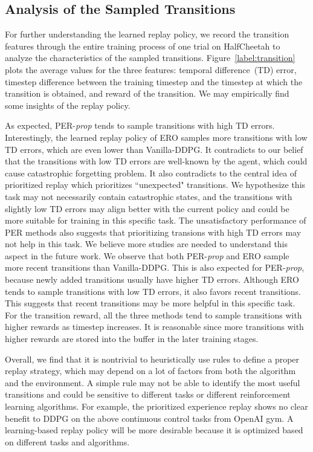 \documentclass{article}
\begin{document}
\subsection{Analysis of the Sampled Transitions}
For further understanding the learned replay policy, we record the transition features through the entire training process of one trial on HalfCheetah to analyze the characteristics of the sampled transitions. Figure~\ref{label:transition} plots the average values for the three features: temporal difference~(TD) error, timestep difference between the training timestep and the timestep at which the transition is obtained, and reward of the transition. We may empirically find some insights of the replay policy.

As expected, PER-\emph{prop} tends to sample transitions with high TD errors. Interestingly, the learned replay policy of ERO samples more transitions with low TD errors, which are even lower than Vanilla-DDPG. It contradicts to our belief that the transitions with low TD errors are well-known by the agent, which could cause catastrophic forgetting problem. It also contradicts to the central idea of prioritized replay which prioritizes ``unexpected" transitions. We hypothesize this task may not necessarily contain catastrophic states, and the transitions with slightly low TD errors may align better with the current policy and could be more suitable for training in this specific task. The unsatisfactory performance of PER methods also suggests that prioritizing transions with high TD errors may not help in this task. We believe more studies are needed to understand this aspect in the future work. We observe that both PER-\emph{prop} and ERO sample more recent transitions than Vanilla-DDPG. This is also expected for PER-\emph{prop}, because newly added transitions usually have higher TD errors. Although ERO tends to sample transitions with low TD errors, it also favors recent transitions. This suggests that recent transitions may be more helpful in this specific task. For the transition reward, all the three methods tend to sample transitions with higher rewards as timestep increases. It is reasonable since more transitions with higher rewards are stored into the buffer in the later training stages.

Overall, we find that it is nontrivial to heuristically use rules to define a proper replay strategy, which may depend on a lot of factors from both the algorithm and the environment. A simple rule may not be able to identify the most useful transitions and could be sensitive to different tasks or different reinforcement learning algorithms. For example, the prioritized experience replay shows no clear benefit to DDPG on the above continuous control tasks from OpenAI gym. A learning-based replay policy will be more desirable because it is optimized based on different tasks and algorithms.
\end{document}
